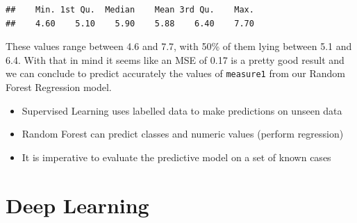 \documentclass[
]{book}
\newenvironment{Shaded}{\begin{snugshade}}{\end{snugshade}}
\newcommand{\KeywordTok}[1]{\textcolor[rgb]{0.13,0.29,0.53}{\textbf{#1}}}
\newcommand{\NormalTok}[1]{#1}
\newcommand{\OperatorTok}[1]{\textcolor[rgb]{0.81,0.36,0.00}{\textbf{#1}}}
\providecommand{\tightlist}{%
  \setlength{\itemsep}{0pt}\setlength{\parskip}{0pt}}
\newenvironment{roundup}
{ \begin{tcolorbox}[colbacktitle=yellow!50!white,
title=Round Up,coltitle=black,
fonttitle=\bfseries] }
{  \end{tcolorbox} }
\begin{document}
\begin{Shaded}
\end{Shaded}

\begin{verbatim}
##    Min. 1st Qu.  Median    Mean 3rd Qu.    Max. 
##    4.60    5.10    5.90    5.88    6.40    7.70
\end{verbatim}

These values range between 4.6 and 7.7, with 50\% of them lying between 5.1 and 6.4. With that in mind it seems like an MSE of 0.17 is a pretty good result and we can conclude to predict accurately the values of \texttt{measure1} from our Random Forest Regression model.

\begin{roundup}
\begin{itemize}
\tightlist
\item
  Supervised Learning uses labelled data to make predictions on unseen data
\item
  Random Forest can predict classes and numeric values (perform regression)
\item
  It is imperative to evaluate the predictive model on a set of known cases
\end{itemize}
\end{roundup}

\hypertarget{deep-learning}{%
\chapter{Deep Learning}\label{deep-learning}}
\end{document}
